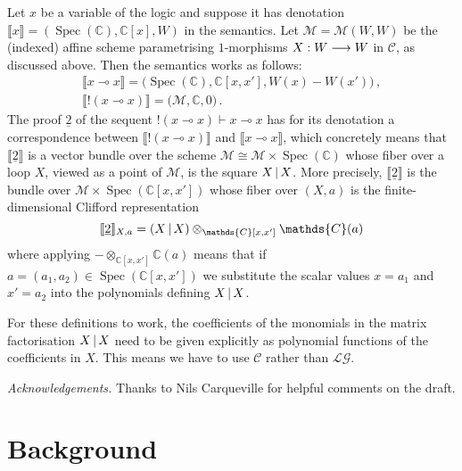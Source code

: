 \documentclass[english,letter paper,12pt,leqno]{article}
\theoremstyle{example}
\numberwithin{equation}{section}
\def\LG{\mathcal{LG}}
\def\be{\begin{equation}}
\def\ee{\end{equation}}
\def\nC{\mathds{C}}
\def\L{\mathcal{C}}
\DeclareMathOperator{\Spec}{Spec}
\begin{document}
Let $x$ be a variable of the logic and suppose it has denotation $\llbracket x \rrbracket = (\Spec(\nC), \nC[x], W)$ in the semantics. Let $\mathscr{M} = \mathscr{M}(W,W)$ be the (indexed) affine scheme parametrising $1$-morphisms $X: W \longrightarrow W$ in $\L$, as discussed above. Then the semantics works as follows:
\begin{gather*}
\llbracket x \multimap x \rrbracket = \big(\Spec(\nC), \nC[x,x'], W(x) - W(x') \big)\,,\\
\llbracket {!}( x \multimap x ) \rrbracket = \big( \mathscr{M}, \nC, 0 \big)\,.
\end{gather*}
The proof $\underline{2}$ of the sequent ${!}(x \multimap x) \vdash x \multimap x$ has for its denotation a correspondence between $\llbracket {!}( x \multimap x ) \rrbracket$ and $\llbracket x \multimap x \rrbracket$, which concretely means that $\llbracket \underline{2} \rrbracket$ is a vector bundle over the scheme $\mathscr{M} \cong \mathscr{M} \times \Spec(\nC)$ whose fiber over a loop $X$, viewed as a point of $\mathscr{M}$, is the square $X \,|\, X$. More precisely, $\llbracket \underline{2} \rrbracket$ is the bundle over $\mathscr{M} \times \Spec(\nC[x,x'])$ whose fiber over $(X, a)$ is the finite-dimensional Clifford representation
\be\label{eq:bundledifferentialcliffordproof}
\llbracket \underline{2} \rrbracket_{X,a} = \left( X \l X \right) \otimes_{\nC[x,x']} \nC(a)
\ee
where applying $- \otimes_{\nC[x,x']} \nC(a)$ means that if $a = (a_1,a_2) \in \Spec(\nC[x,x'])$ we substitute the scalar values $x = a_1$ and $x' = a_2$ into the polynomials defining $X \,|\, X$.

For these definitions to work, the coefficients of the monomials in the matrix factorisation $X \,|\, X$ need to be given explicitly as polynomial functions of the coefficients in $X$. This means we have to use $\L$ rather than $\LG$.

\medskip

\emph{Acknowledgements.} Thanks to Nils Carqueville for helpful comments on the draft.%

\section{Background}\label{section:background}
\end{document}
